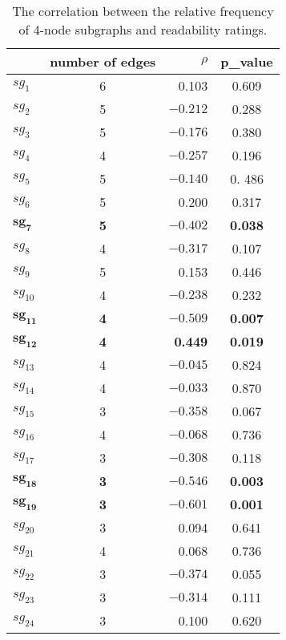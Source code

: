 \begin{table}[!t]
\centering
\begin{small}
\begin{tabular}{lcrc}
\hline
   & number of edges & $\rho$ & p\_value\\\hline
$sg_1$ & 6 & 0.103 & 0.609   \\
$sg_2$ & 5 & $-0.212$ & 0.288    \\
$sg_3$  & 5 &   $-0.176$ & 0.380      \\
$sg_4$  & 4 &$-0.257$ & 0.196    \\
$sg_5$ & 5 &$-0.140$ & 0. 486   \\
$sg_6$  & 5 &   0.200 &  0.317  \\
$\mathbf{sg_7}$ & \textbf{5} & $\mathbf{-0.402}$ & \textbf{0.038}  \\
$sg_8$  & 4 &$-0.317$ & 0.107 \\
$sg_9$ & 5 & 0.153 & 0.446   \\
$sg_{10}$ & 4 & $-0.238$ & 0.232    \\
$\mathbf{sg_{11}}$ & \textbf{4} & $\mathbf{-0.509}$     & \textbf{0.007}\\
$\mathbf{sg_{12}}$  & \textbf{4} &\textbf{0.449} & \textbf{0.019}    \\
$sg_{13}$  & 4 & $-0.045$ & 0.824    \\
$sg_{14}$ & 4 & $-0.033$ & 0.870\\
$sg_{15}$ & 3 &$-0.358$ & 0.067    \\
$sg_{16}$ &     4 &$-0.068$ & 0.736    \\
$sg_{17}$  & 3 & $-0.308$ & 0.118    \\
$\mathbf{sg_{18}}$ & \textbf{3} & $\mathbf{-0.546}$      & \textbf{0.003}   \\
$\mathbf{sg_{19}}$ & \textbf{3} & $\mathbf{-0.601}$ & \textbf{0.001}   \\
$sg_{20}$ & 3 & 0.094   & 0.641 \\
$sg_{21}$  & 4 & 0.068 & 0.736   \\
$sg_{22}$ &  3& $-0.374$ &  0.055  \\
$sg_{23}$ &     3&$-0.314$ & 0.111 \\
$sg_{24}$ &     3& 0.100 & 0.620  \\
\hline
\end{tabular}
\end{small}
\caption{The correlation between the relative frequency of 4-node subgraphs and readability ratings.}\label{t:correlation_4node_subgraph}
\end{table}


